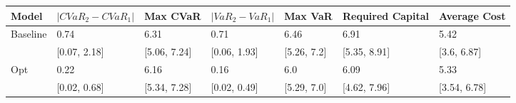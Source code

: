 \begin{tabular}{lllllll}
\toprule
   Model & $|CVaR_2 - CVaR_1|$ &     Max CVaR & $|VaR_2 - VaR_1|$ &     Max VaR & Required Capital & Average Cost \\
\midrule
Baseline &                0.74 &         6.31 &              0.71 &        6.46 &             6.91 &         5.42 \\
         &        [0.07, 2.18] & [5.06, 7.24] &      [0.06, 1.93] & [5.26, 7.2] &     [5.35, 8.91] &  [3.6, 6.87] \\
     Opt &                0.22 &         6.16 &              0.16 &         6.0 &             6.09 &         5.33 \\
         &        [0.02, 0.68] & [5.34, 7.28] &      [0.02, 0.49] & [5.29, 7.0] &     [4.62, 7.96] & [3.54, 6.78] \\
\bottomrule
\end{tabular}
